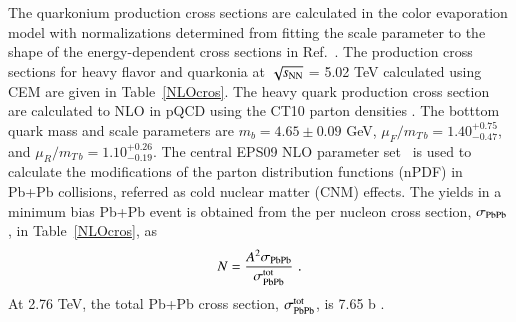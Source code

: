 The quarkonium production cross sections are calculated in the
color evaporation model with normalizations determined from fitting the
scale parameter to the shape of the energy-dependent cross sections in Ref.~\cite{Nelson:2012bc}.
The production cross sections for heavy flavor and quarkonia at $\sqrt{s_{\rm NN}}$ = 5.02 
TeV \cite{Kumar:2012qx} calculated using CEM are given in Table~\ref{NLOcros}.
 The heavy quark production cross section are calculated to NLO in pQCD  
 using the CT10 parton densities \cite{Lai:2010vv}.
 The botttom quark mass and scale parameters are $m_b = 4.65 \pm 0.09$ GeV,
$\mu_F/m_{T\, b} = 1.40^{+0.75}_{-0.47}$, and $\mu_R/m_{T\, b} = 1.10^{+0.26}_{-0.19}$.
The central EPS09 NLO parameter set~\cite{Eskola:2009uj} is used to 
calculate the modifications of the parton distribution functions (nPDF) in 
Pb+Pb collisions, referred as cold nuclear matter (CNM) effects.
The yields in a minimum bias 
Pb+Pb event is obtained from the per nucleon cross
section, $\sigma_{\rm PbPb}$, in Table~\ref{NLOcros}, as
\begin{eqnarray}
N = {A^2 \sigma_{\rm PbPb} \over  
\sigma_{\rm PbPb}^{\rm tot}} \, \, .
\end{eqnarray}
 At 2.76 TeV, the total Pb+Pb cross section, $\sigma_{\rm PbPb}^{\rm tot}$, 
is 7.65 b \cite{Chatrchyan:2011sx}.


%
%




